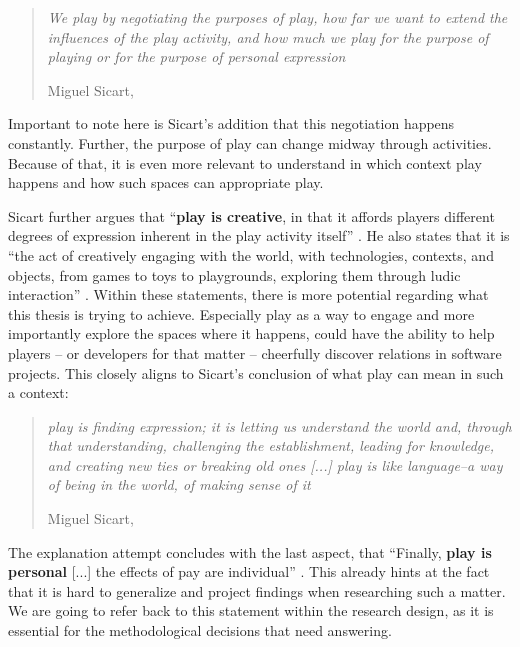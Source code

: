 \begin{quote}
  \textit{We play by negotiating the purposes of play, how far we want to extend the influences of the play activity, and how much we play for the purpose of playing or for the purpose of personal expression}

  \footnotesize{Miguel Sicart, \cite[p. 16]{sicart2014play}}
\end{quote}

Important to note here is Sicart's addition that this negotiation happens constantly. Further, the purpose of play can change midway through activities. Because of that, it is even more relevant to understand in which context play happens and how such spaces can appropriate play.

Sicart further argues that \enquote{\textbf{play is creative}, in that it affords players different degrees of expression inherent in the play activity itself} \cite[p. 17]{sicart2014play}. He also states that it is \enquote{the act of creatively engaging with the world, with technologies, contexts, and objects, from games to toys to playgrounds, exploring them through ludic interaction} \cite[p. 17]{sicart2014play}. Within these statements, there is more potential regarding what this thesis is trying to achieve. Especially play as a way to engage and more importantly explore the spaces where it happens, could have the ability to help players -- or developers for that matter -- cheerfully discover relations in software projects. This closely aligns to Sicart's conclusion of what play can mean in such a context:

\begin{quote}
  \textit{play is finding expression; it is letting us understand the world and, through  that understanding, challenging the establishment, leading for knowledge, and creating new ties or breaking old ones [...] play is like language--a way of being in the world, of making sense of it}

  \footnotesize{Miguel Sicart, \cite[p. 18]{sicart2014play}}
\end{quote}

The explanation attempt concludes with the last aspect, that \enquote{Finally, \textbf{play is personal} [...] the effects of pay are individual} \cite[p. 17]{sicart2014play}. This already hints at the fact that it is hard to generalize and project findings when researching such a matter. We are going to refer back to this statement within the research design, as it is essential for the methodological decisions that need answering.

